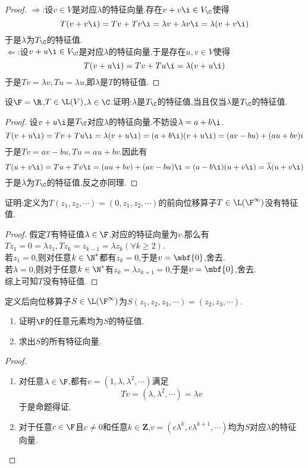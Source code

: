 \documentclass{ctexart}
\begin{document}
\begin{proof}
    $\Rightarrow$:设$v\in V$是对应$\lambda$的特征向量.存在$v+v\i\in V_\C$使得
    $$T(v+v\i)=Tv+Tv\i=\lambda v+\lambda v\i=\lambda(v+v\i)$$
    于是$\lambda$为$T_\C$的特征值.\\
    $\Leftarrow$:设$v+u\i\in V_\C$是对应$\lambda$的特征向量.于是存在$u,v\in V$使得
    $$T(v+u\i)=Tv+Tu\i=\lambda(v+u\i)$$
    于是$Tv=\lambda v,Tu=\lambda u$,即$\lambda$是$T$的特征值.
\end{proof}
\begin{problem}[18.]
    设$\F=\R$,$T\in\L(V)$,$\lambda\in\C$.证明:$\lambda$是$T_\C$的特征值,当且仅当$\overline{\lambda}$是$T_\C$的特征值.
\end{problem}
\begin{proof}
    设$v+u\i$是$T_\C$对应$\lambda$的特征向量.不妨设$\lambda=a+b\i$.
    $$T(v+u\i)=Tv+Tu\i=\lambda(v+u\i)=(a+b\i)(v+u\i)=(av-bu)+(au+bv)i$$
    于是$Tv=av-bu,Tu=au+bv$.因此有
    $$T(u+v\i)=Tu+Tv\i=(au+bv)+(av-bu)\i=(a-b\i)(u+v\i)=\overline{\lambda}(u+v\i)$$
    于是$\overline{\lambda}$为$T_\C$的特征值.反之亦同理.
\end{proof}
\begin{problem}[19.]
    证明:定义为$T(z_1,z_2,\cdots)=(0,z_1,z_2,\cdots)$的前向位移算子$T\in\L(\F^\infty)$没有特征值.
\end{problem}
\begin{proof}
    假定$T$有特征值$\lambda\in\F$,对应的特征向量为$v$.那么有$Tz_1=0=\lambda z_1,Tz_k=z_{k-1}=\lambda z_k(\forall k\geqslant 2)$.\\
    若$z_1=0$,则对任意$k\in\N^*$都有$z_k=0$,于是$v=\mbf{0}$,舍去.\\
    若$\lambda=0$,则对于任意$k\in\N^*$有$z_k=\lambda z_{k+1}=0$,于是$v=\mbf{0}$,舍去.\\
    综上可知$T$没有特征值.
\end{proof}
\begin{problem}[20.]
    定义后向位移算子$S\in\L(\F^\infty)$为$S(z_1,z_2,z_3,\cdots)=(z_2,z_3,\cdots)$.
    \begin{enumerate}[label=\tbf{(\arabic*)}]
        \item 证明$\F$的任意元素均为$S$的特征值.
        \item 求出$S$的所有特征向量.
    \end{enumerate}
\end{problem}
\begin{proof}
    \begin{enumerate}[label=\tbf{(\arabic*)}]
        \item 对任意$\lambda\in\F$,都有$v=(1,\lambda,\lambda^2,\cdots)$满足
            $$Tv=(\lambda,\lambda^2,\cdots)=\lambda v$$
            于是命题得证.
        \item 对于任意$c\in\F$且$c\neq 0$和任意$k\in\mathbf{Z}$,$v=(c\lambda^k,c\lambda^{k+1},\cdots)$均为$S$对应$\lambda$的特征向量.
    \end{enumerate}
\end{proof}
\end{document}
